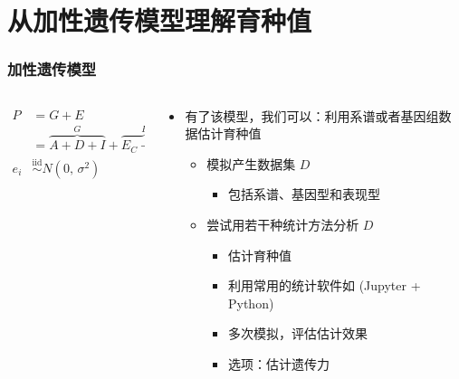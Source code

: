 \documentclass[serif,aspectratio=169]{beamer}
\begin{document}
\section{从加性遗传模型理解育种值}
\begin{frame}
  \frametitle{加性遗传模型}
  \begin{columns}
    \begin{column}{.5\textwidth}
      \begin{align*}
        P&=G+E\\
        &=\overbrace{A+D+I}^G+\overbrace{E_C+E_S}^E\\
        e_i&\stackrel{\mathrm{iid}}{\sim}N(0,\,\sigma^2)
      \end{align*}
      
    \end{column}

    \pause
    \begin{column}{.5\textwidth}
      \begin{itemize}
      \item 有了该模型，我们可以：利用系谱或者基因组数据估计育种值
        \begin{itemize}
        \item 模拟产生数据集 $D$
          \begin{itemize}
          \item 包括系谱、基因型和表现型
          \end{itemize}
        \item 尝试用若干种统计方法分析 $D$
          \begin{itemize}
          \item 估计育种值
          \item 利用常用的统计软件如 (Jupyter + Python)
          \item 多次模拟，评估估计效果
          \item 选项：估计遗传力
          \end{itemize}
        \end{itemize}
      \end{itemize}
    \end{column}
  \end{columns}
\end{frame}
\end{document}
